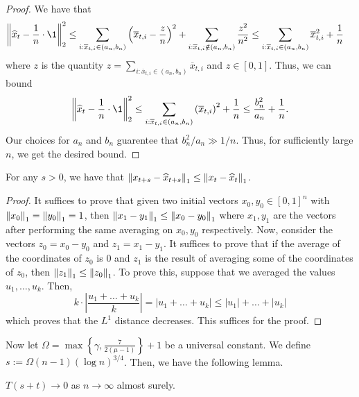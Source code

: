 \documentclass[12pt]{article}
\begin{document}
\begin{proof}
	We have that 
	\begin{align*}
		\norm{\widehat{x}_t - \frac{1}{n} \cdot \1}_2^2 & \leq \sum_{i : \overline{x}_{t, i} \in (a_n, b_n)} \left ( \overline{x}_{t, i} - \frac{z}{n} \right )^2 + \sum_{i : \overline{x}_{t, i} \notin (a_n, b_n)} \frac{z^2}{n^2} \leq \sum_{i : \overline{x}_{t, i} \in (a_n, b_n)} \overline{x}_{t, i}^2 + \frac{1}{n}
	\end{align*}
	where $z$ is the quantity $z = \sum_{i : \overline{x}_{t, i} \in (a_n, b_n)} \overline{x}_{t, i}$ and $z \in [0, 1]$. 
	Thus, we can bound 
	\[
		\norm{\widehat{x}_t - \frac{1}{n} \cdot \1}_2^2	\leq \sum_{i : \overline{x}_{t, i} \in (a_n, b_n)} \left ( \overline{x}_{t, i} \right )^2 + \frac{1}{n} \leq \frac{b_n^2}{a_n} + \frac{1}{n}.
	\]
	Our choices for $a_n$ and $b_n$ guarentee that $b_n^2 / a_n \gg 1/n$. Thus, for sufficiently large $n$, we get the desired bound.
\end{proof}

\begin{lem}
	For any $s > 0$, we have that $\left\lVert x_{t+s} - \widehat{x}_{t+s} \right\rVert_1 \leq \left\lVert x_t - \widehat{x}_t \right\rVert_1$. 
\end{lem}
\begin{proof}
	It suffices to prove that given two initial vectors $x_0, y_0 \in [0, 1]^n$ with $\left\lVert x_0 \right\rVert_1 =\left\lVert y_0 \right\rVert_1 = 1$, then $\left\lVert x_1 - y_1 \right\rVert_1 \leq \left\lVert x_0 - y_0 \right\rVert_1$ where  $x_1, y_1$ are the vectors after performing the same averaging on $x_0, y_0$ respectively. Now, consider the vectors $z_0 = x_0 - y_0$ and $z_1 = x_1 - y_1$. It suffices to prove that if the average of the coordinates of $z_0$ is $0$ and $z_1$ is the result of averaging some of the coordinates of $z_0$, then $\left\lVert z_1 \right\rVert_1 \leq \left\lVert z_0 \right\rVert_1$. To prove this, suppose that we averaged the values $u_1, \ldots, u_k$. Then,
	\[
		k \cdot \left | \frac{u_1 + \ldots + u_k}{k} \right | = |u_1 + \ldots + u_k| \leq |u_1| + \ldots + |u_k|
	\]
	which proves that the $L^1$ distance decreases. This suffices for the proof. 
	\end{proof}

Now let $\Omega = \max \left \{\gamma, \frac{7}{2(\mu -1)} \right \} + 1$ be a universal constant. We define $s := \Omega (n-1) (\log n)^{3/4}$. Then, we have the following lemma. 

\begin{lem}
	$T(s+t) \to 0$ as $n \to \infty$ almost surely. 
\end{lem}
\end{document}
